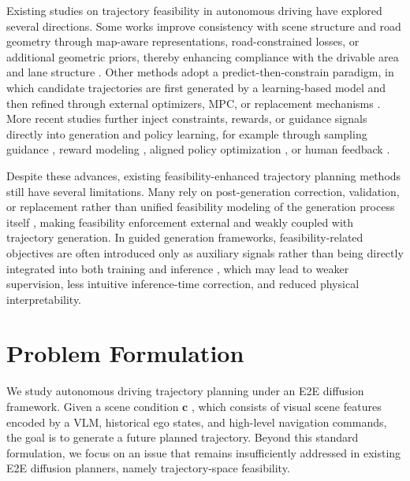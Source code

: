 \documentclass[3p,times,authoryear]{elsarticle}
\newcommand{\ccond}{\mathbf{c}}
\begin{document}
Existing studies on trajectory feasibility in autonomous driving have explored several directions. Some works improve consistency with scene structure and road geometry through map-aware representations, road-constrained losses, or additional geometric priors, thereby enhancing compliance with the drivable area and lane structure \citep{scenecompliant2020,ellipse2021,laneheading2021}. Other methods adopt a predict-then-constrain paradigm, in which candidate trajectories are first generated by a learning-based model and then refined through external optimizers, MPC, or replacement mechanisms \citep{injectingknowledge2021,safetynet2022,dynamicdrivablecorridor2025}. More recent studies further inject constraints, rewards, or guidance signals directly into generation and policy learning, for example through sampling guidance \citep{diffusiones2024,zheng2025diffusionplanner}, reward modeling \citep{gendrive2025}, aligned policy optimization \citep{diffusiondrivev2,safeauto2025,safevla2025,alphadrive2025}, or human feedback \citep{trajhf2025}.

Despite these advances, existing feasibility-enhanced trajectory planning methods still have several limitations. Many rely on post-generation correction, validation, or replacement rather than unified feasibility modeling of the generation process itself \citep{injectingknowledge2021,safetynet2022,dynamicdrivablecorridor2025}, making feasibility enforcement external and weakly coupled with trajectory generation. In guided generation frameworks, feasibility-related objectives are often introduced only as auxiliary signals rather than being directly integrated into both training and inference \citep{diffusiones2024,zheng2025diffusionplanner,gendrive2025,safevla2025,li2025recogdrive}, which may lead to weaker supervision, less intuitive inference-time correction, and reduced physical interpretability.


\section{Problem Formulation}

We study autonomous driving trajectory planning under an E2E diffusion framework. Given a scene condition $\ccond$ , which consists of visual scene features encoded by a VLM, historical ego states, and high-level navigation commands, the goal is to generate a future planned trajectory. Beyond this standard formulation, we focus on an issue that remains insufficiently addressed in existing E2E diffusion planners, namely trajectory-space feasibility.
\end{document}
